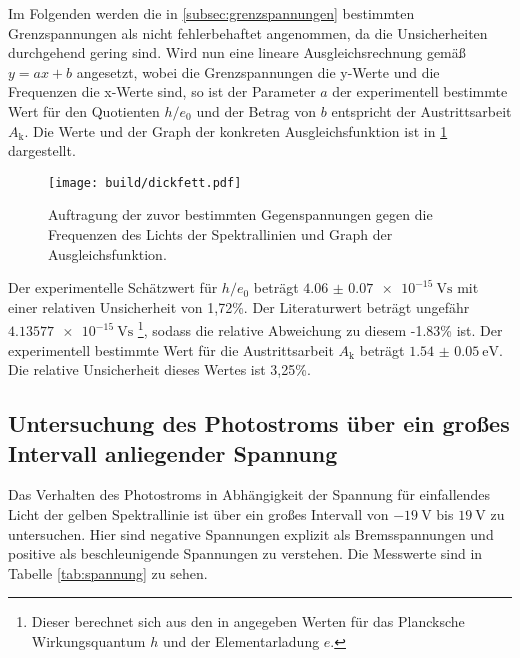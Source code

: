 Im Folgenden werden die in \ref{subsec:grenzspannungen} bestimmten Grenzspannungen
als nicht fehlerbehaftet angenommen, da die Unsicherheiten durchgehend gering sind.
Wird nun eine lineare Ausgleichsrechnung gemäß $y = ax+b$ angesetzt, wobei die Grenzspannungen
die y-Werte und die Frequenzen die x-Werte sind, so ist der Parameter $a$ der experimentell
bestimmte Wert für den Quotienten $h/e_0$ und der Betrag von $b$ entspricht der Austrittsarbeit
$A_\text{k}$. Die Werte und der Graph der konkreten Ausgleichsfunktion ist in \ref{fig:spannungfrequenz}
dargestellt.

\begin{figure}
  \centering
  \texttt{[image: build/dickfett.pdf]}
  \caption{Auftragung der zuvor bestimmten Gegenspannungen gegen die Frequenzen des Lichts der Spektrallinien und Graph der Ausgleichsfunktion.}
  \label{fig:spannungfrequenz}
\end{figure}

Der experimentelle Schätzwert für $h/e_0$ beträgt $\SI{4.06(007)e-15}{\volt\second}$ mit einer relativen Unsicherheit von 1,72\%.
Der Literaturwert beträgt ungefähr $\SI{4.13577e-15}{\volt\second}$ \footnote{Dieser berechnet
sich aus den in \cite{hunde_0} angegeben Werten für das Plancksche Wirkungsquantum $h$ und der Elementarladung $e$.},
sodass die relative Abweichung zu diesem -1.83\% ist.
Der experimentell bestimmte Wert für die Austrittsarbeit $A_\text{k}$ beträgt $\SI{1.54(005)}{\electronvolt}$.
Die relative Unsicherheit dieses Wertes ist 3,25\%.

\subsection{Untersuchung des Photostroms über ein großes Intervall anliegender Spannung}
\label{subsec:drei}

Das Verhalten des Photostroms in Abhängigkeit der Spannung für einfallendes Licht
der gelben Spektrallinie ist über ein großes Intervall von $\SI{-19}{\volt}$ bis $\SI{19}{\volt}$
zu untersuchen. Hier sind negative Spannungen explizit als Bremsspannungen und positive als
beschleunigende Spannungen zu verstehen. Die Messwerte sind in Tabelle \ref{tab:spannung}
zu sehen.

